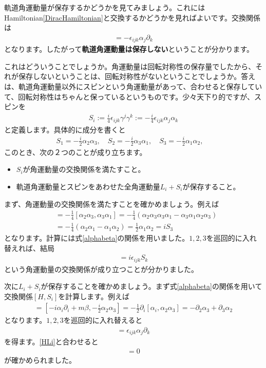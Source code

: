 \documentclass[report,paper=a4, fontsize=12pt, line_length=16cm, number_of_lines=33,dvipdfmx]{jlreq}
\numberwithin{equation}{chapter}
\newcommand{\del}{\partial}
\newcommand{\strong}[1]{{\sffamily \bfseries #1}}
\begin{document}
軌道角運動量が保存するかどうかを見てみましょう。これにはHamiltonian\eqref{DiracHamiltonian}と交換するかどうかを見ればよいです。交換関係は
\begin{align}
  [H,L_i]=-\epsilon_{ijk}\alpha_{j}\del_{k}\label{HLi}
\end{align}
となります。したがって\strong{軌道角運動量は保存しない}ということが分かります。

これはどういうことでしょうか。角運動量は回転対称性の保存量でしたから、それが保存しないということは、回転対称性がないということでしょうか。答えは、軌道角運動量以外にスピンという角運動量があって、合わせると保存していて、回転対称性はちゃんと保っているというものです。少々天下り的ですが、スピンを
\begin{align}
  S_i
  :=\frac{i}{4}\epsilon_{ijk}\gamma^{j}\gamma^{k}
  :=-\frac{i}{4}\epsilon_{ijk}\alpha_{j}\alpha_{k}
\end{align}
と定義します。具体的に成分を書くと
\begin{align}
  S_1=-\frac{i}{2}\alpha_{2}\alpha_{3},\quad
  S_2=-\frac{i}{2}\alpha_{3}\alpha_{1},\quad
  S_3=-\frac{i}{2}\alpha_{1}\alpha_{2},\quad
\end{align}
このとき、次の２つのことが成り立ちます。
\begin{itemize}
  \item $S_i$が角運動量の交換関係を満たすこと。
  \item 軌道角運動量とスピンをあわせた全角運動量$L_i+S_i$が保存すること。
\end{itemize}

まず、角運動量の交換関係を満たすことを確かめましょう。例えば
\begin{align}
  [S_1,S_2]&=-\frac{1}{4}[\alpha_{2}\alpha_{3},\alpha_{3}\alpha_{1}]
  =-\frac{1}{4}(\alpha_{2}\alpha_{3}\alpha_{3}\alpha_{1}-\alpha_{3}\alpha_{1}\alpha_{2}\alpha_{3})\nonumber\\
  &=-\frac{1}{4}(\alpha_{2}\alpha_{1}-\alpha_{1}\alpha_{2})
  =\frac{1}{2}\alpha_{1}\alpha_{2}
  =iS_3
\end{align}
となります。計算には式\eqref{alphabeta}の関係を用いました。$1,2,3$を巡回的に入れ替えれば、結局
\begin{align}
  [S_i,S_j]=i\epsilon_{ijk}S_k
\end{align}
という角運動量の交換関係が成り立つことが分かりました。

次に$L_i+S_i$が保存することを確かめましょう。まず式\eqref{alphabeta}の関係を用いて交換関係$[H,S_i]$を計算します。例えば
\begin{align}
  [H,S_1]
  =[-i\alpha_i\del_i+m\beta,-\frac{i}{2}\alpha_2\alpha_3]
  =-\frac12\del_{i}[\alpha_i,\alpha_2\alpha_3]
  =-\del_{2}\alpha_{3}+\del_{3}\alpha_{2}
\end{align}
となります。$1,2,3$を巡回的に入れ替えると
\begin{align}
  [H,S_i]=\epsilon_{ijk}\alpha_{j}\del_{k}
\end{align}
を得ます。\eqref{HLi}と合わせると
\begin{align}
  [H,L_i+S_i]=0
\end{align}
が確かめられました。
\end{document}
